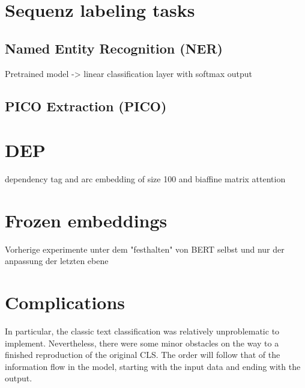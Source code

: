 \section{Sequenz labeling tasks}
\subsection{Named Entity Recognition (NER)}
\color{ForestGreen}
Pretrained model -> linear classification layer with softmax output
\color{black}
\subsection{PICO Extraction (PICO)}

\color{ForestGreen}
\section{DEP}
dependency  tag and arc embedding of size 100 and biaffine matrix attention 
\section{Frozen embeddings}
Vorherige experimente unter dem "festhalten" von BERT selbst und nur der anpassung der letzten ebene
\color{black}
\section{Complications}
In particular, the classic text classification was relatively unproblematic to implement. Nevertheless, there were some minor obstacles on the way to a finished reproduction of the original CLS. The order will follow that of the information flow in the model, starting with the input data and ending with the output.

